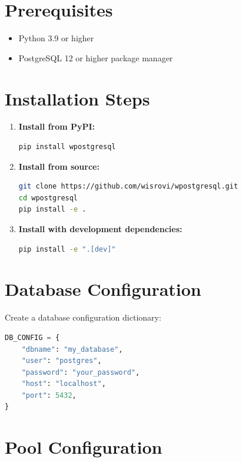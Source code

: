 \documentclass[12pt,a4paper]{report}
\begin{document}
\section{Prerequisites}

\begin{itemize}
	\item Python 3.9 or higher
	\item PostgreSQL 12 or higher
	      \pip package manager
\end{itemize}

\section{Installation Steps}

\begin{enumerate}
	\item \textbf{Install from PyPI:}
	      \begin{lstlisting}[language=bash]
pip install wpostgresql
    \end{lstlisting}

	\item \textbf{Install from source:}
	      \begin{lstlisting}[language=bash]
git clone https://github.com/wisrovi/wpostgresql.git
cd wpostgresql
pip install -e .
    \end{lstlisting}

	\item \textbf{Install with development dependencies:}
	      \begin{lstlisting}[language=bash]
pip install -e ".[dev]"
    \end{lstlisting}
\end{enumerate}

\section{Database Configuration}

Create a database configuration dictionary:

\begin{lstlisting}[language=Python, caption=Database Configuration]
DB_CONFIG = {
    "dbname": "my_database",
    "user": "postgres",
    "password": "your_password",
    "host": "localhost",
    "port": 5432,
}
\end{lstlisting}

\section{Pool Configuration}
\end{document}
